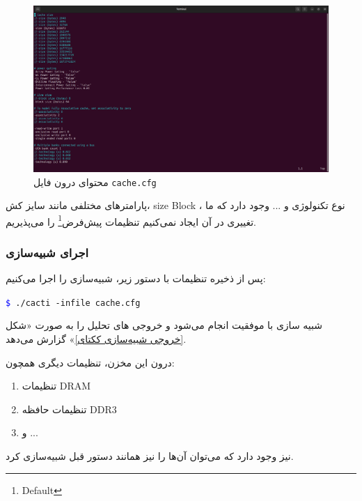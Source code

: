 \documentclass[12pt]{exam}
\begin{document}
\begin{questions}
\begin{figure}[h]
	\centering
	\includegraphics[width=1\textwidth]{images/img4}
	\caption{محتوای درون فایل \texttt{cache.cfg}}
	\label{حتوای درون فایل کش}
\end{figure}

پارامتر‌های مختلفی مانند سایز کش، size Block ، نوع تکنولوژی و ... وجود دارد که ما تغییری در آن ایجاد نمی‌کنیم تنظیمات پیش‌فرض\footnote{Default} را می‌پذیریم. \newpage



\subsubsection{اجرای شبیه‌سازی}
پس از ذخیره تنظیمات با دستور زیر، شبیه‌سازی را اجرا می‌کنیم:\\

\begin{latin}
	\texttt{\textcolor{blue}{\$} ./cacti -infile cache.cfg}\\
\end{latin}

شبیه سازی با موفقیت انجام می‌شود و خروجی های تحلیل را به صورت «شکل \textcolor{blue}{\ref{خروجی شبیه‌سازی ککتای}}» گزارش می‌دهد.

درون این مخزن، تنظیمات دیگری همچون:
\begin{enumerate}
	\item تنظیمات DRAM
	\item تنظیمات حافظه DDR3
	\item و ...
\end{enumerate}

نیز وجود دارد که می‌توان آن‌ها را نیز همانند دستور قبل شبیه‌سازی کرد.


\end{questions}
\end{document}
